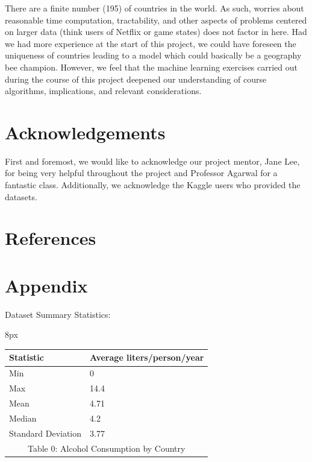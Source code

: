 \documentclass{article}
\begin{document}
\begin{multicols}{2}
There are a finite number (195) of countries in the world. As such, worries about reasonable time computation, tractability, and other aspects of problems centered on larger data (think users of Netflix or game states) does not factor in here. Had we had more experience at the start of this project, we could have foreseen the uniqueness of countries leading to a model which could basically be a geography bee champion. However, we feel that the machine learning exercises carried out during the course of this project deepened our understanding of course algorithms, implications, and relevant considerations.

\section{Acknowledgements} First and foremost, we would like to acknowledge our project mentor, Jane Lee, for being very helpful throughout the project and Professor Agarwal for a fantastic class. Additionally, we acknowledge the Kaggle users who provided the datasets.

\end{multicols}

\pagebreak

\section{References} \theendnotes

\section{Appendix}

Dataset Summary Statistics:

\begin{adjustwidth}{8px}{}
\centering
\begin{tabular}{|l|l|}
\hline
Statistic          & Average liters/person/year \\ \hline
Min                & 0                          \\ \hline
Max                & 14.4                       \\ \hline
Mean               & 4.71                       \\ \hline
Median             & 4.2                        \\ \hline
Standard Deviation & 3.77                       \\ \hline
\multicolumn{2}{c}{Table 0: Alcohol Consumption by Country} 
\label{summary-statistic-table-alcohol}
\end{tabular}
\end{adjustwidth}
\end{document}
